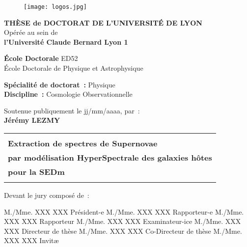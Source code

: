 \documentclass[../main/main.tex]{subfiles}
\begin{document}
\begin{titlepage}
    \begin{center}
        \begin{figure}[h]
            \centering
            \texttt{[image: logos.jpg]}
        \end{figure}

        \vfill

        {\large\bfseries THÈSE de DOCTORAT DE L'UNIVERSITÉ DE LYON\\}
        {Opérée au sein de\\}
        {\large \bfseries l'Université Claude Bernard Lyon 1\\}
        \bigbreak

        {\large \textbf{École Doctorale} ED52\\
        École Doctorale de Physique et Astrophysique}
        \bigbreak

        {\large \textbf{Spécialité de doctorat~:} Physique \\}
        {\large \textbf{Discipline~:} Cosmologie Observationnelle}

        \vfill

        {Soutenue publiquement le jj/mm/aaaa, par~:\\}
        {\Large\bfseries {Jérémy LEZMY}\\}
        \vspace{0.5cm}
        \begin{tabularx}{\linewidth}{Y}
            \toprule
            \\[0.2em]
            \Large \bfseries Extraction de spectres de Supernovae \\[8pt]
            \Large \bfseries par modélisation HyperSpectrale des
            galaxies hôtes\\[8pt]
            \Large \bfseries pour la SEDm\\
            \\[-0.2em]
            \bottomrule
        \end{tabularx}

        \vfill

    \end{center}

\vfill

Devant le jury composé de~: \bigbreak

M./Mme. XXX XXX \hfill Président-e\smallbreak
M./Mme. XXX XXX \hfill Rapporteur-e\smallbreak
M./Mme. XXX XXX \hfill Rapporteur\smallbreak
M./Mme. XXX XXX \hfill Examinateur-ice\smallbreak
M./Mme. XXX XXX \hfill Directeur de thèse\smallbreak
M./Mme. XXX XXX \hfill Co-Directeur de thèse\smallbreak
M./Mme. XXX XXX \hfill Invitæ\smallbreak

\vfill

\end{titlepage}
\end{document}
